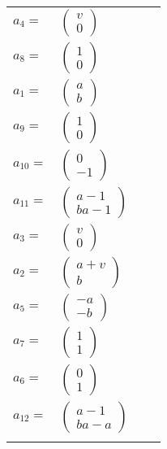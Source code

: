 \documentclass[1p]{elsarticle_modified}
\theoremstyle{definition}
\begin{document}
\begin{tabular}{m{7pt} m{180pt} m{7pt} m{180pt} }
\flushright $a_{4}=$&$\begin{pmatrix}v\\0\end{pmatrix}$ \\
\flushright $a_{8}=$&$\begin{pmatrix}1\\0\end{pmatrix}$ \\
\flushright $a_{1}=$&$\begin{pmatrix}a\\b\end{pmatrix}$ \\
\flushright $a_{9}=$&$\begin{pmatrix}1\\0\end{pmatrix}$ \\
\flushright $a_{10}=$&$\begin{pmatrix}0\\-1\end{pmatrix}$ \\
\flushright $a_{11}=$&$\begin{pmatrix}a-1\\b a-1\end{pmatrix}$ \\
\flushright $a_{3}=$&$\begin{pmatrix}v\\0\end{pmatrix}$ \\
\flushright $a_{2}=$&$\begin{pmatrix}a+v\\b\end{pmatrix}$ \\
\flushright $a_{5}=$&$\begin{pmatrix}- a\\- b\end{pmatrix}$ \\
\flushright $a_{7}=$&$\begin{pmatrix}1\\1\end{pmatrix}$ \\
\flushright $a_{6}=$&$\begin{pmatrix}0\\1\end{pmatrix}$ \\
\flushright $a_{12}=$&$\begin{pmatrix}a-1\\b a- a\end{pmatrix}$\\&\end{tabular}
\end{document}
